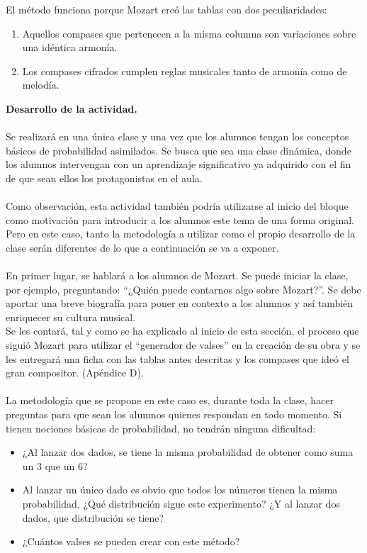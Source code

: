 \documentclass[a4paper, openright, 11pt, titlepage]{report}
\theoremstyle{definition}\newtheorem{defin}[propo]{Definition}
\theoremstyle{definition}\newtheorem{obser}[propo]{Remark}
\theoremstyle{definition}\newtheorem{ejem}[propo]{Ejemplo}
\theoremstyle{definition}\newtheorem{algoritmo}[propo]{Algoritmo}
\begin{document}
El método funciona porque Mozart creó las tablas con dos peculiaridades:
\begin{enumerate}
    \item Aquellos compases que pertenecen a la misma columna son variaciones sobre una idéntica armonía.
    \item Los compases cifrados cumplen reglas musicales tanto de armonía como de melodía.
\end{enumerate}
\textbf{Desarrollo de la actividad.}\\\\
Se realizará en una única clase y una vez que los alumnos tengan los conceptos básicos de probabilidad asimilados. Se busca que sea una clase dinámica, donde los alumnos intervengan con un aprendizaje significativo ya adquirido con el fin de que sean ellos los protagonistas en el aula.\\\\
Como observación, esta actividad también podría utilizarse al inicio del bloque como motivación para introducir a los alumnos este tema de una forma original. Pero en este caso, tanto la metodología a utilizar como el propio desarrollo de la clase serán diferentes de lo que a continuación se va a exponer.\\\\
En primer lugar, se hablará a los alumnos de Mozart. Se puede iniciar la clase, por ejemplo, preguntando: ``¿Quién puede contarnos algo sobre Mozart?''. Se debe aportar una breve biografía para poner en contexto a los alumnos y así también enriquecer su cultura musical.\\
Se les contará, tal y como se ha explicado al inicio de esta sección, el proceso que siguió Mozart para utilizar el “generador de valses” en la creación de su obra y se les entregará una ficha con las tablas antes descritas y los compases que ideó el gran compositor. (Apéndice D).\\\\
La metodología que se propone en este caso es, durante toda la clase, hacer preguntas para que sean los alumnos quienes respondan en todo momento. Si tienen nociones básicas de probabilidad, no tendrán ninguna dificultad:
\begin{itemize}
    \item ¿Al lanzar dos dados, se tiene la misma probabilidad de obtener como suma un 3 que un 6?\\
    \item Al lanzar un único dado es obvio que todos los números tienen la misma probabilidad. ¿Qué distribución sigue este experimento? ¿Y al lanzar dos dados, que distribución se tiene?
    \item ¿Cuántos valses se pueden crear con este método?
    
\end{itemize}
\end{document}
